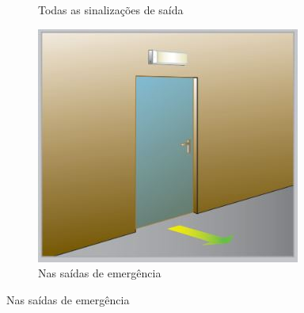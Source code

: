 \begin{figure}[H]
\begin{subfigure}[b]{0.3\textwidth}
			\caption{Todas as sinalizações de saída}
			\label{fig: style 1 image b}
		\end{subfigure}
		\hfill
		\begin{subfigure}[b]{0.3\textwidth}
			\centering
			\includegraphics[width=\textwidth]{Figures/3. Lighting/light-safety3.jpg}
			\caption{Nas saídas de emergência}
			\label{fig: style 1 image c}
		\end{subfigure}
	\end{figure}

